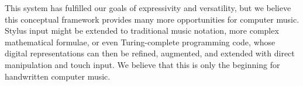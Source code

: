 \documentclass{nime-alternate}
\begin{document}
This system has fulfilled our goals of expressivity and versatility, but we believe this conceptual framework provides many more opportunities for computer music. 
Stylus input might be extended to traditional music notation, more complex mathematical formulae, or even Turing-complete programming code, whose digital representations can then be refined, augmented, and extended with direct manipulation and touch input. 
We believe that this is only the beginning for handwritten computer music. 


%

%
%


\end{document}
